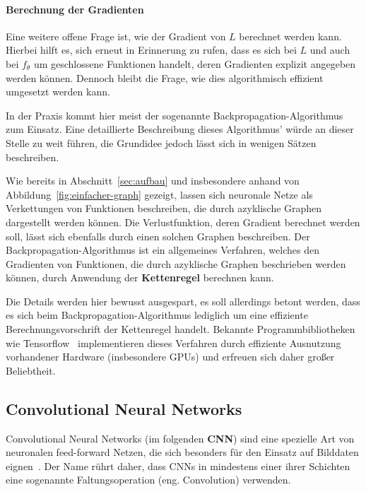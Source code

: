 \paragraph{Berechnung der Gradienten}

Eine weitere offene Frage ist, wie der Gradient von $L$ berechnet werden
kann. Hierbei hilft es, sich erneut in Erinnerung zu rufen, dass es sich
bei $L$ und auch bei $f_\theta$ um geschlossene Funktionen handelt,
deren Gradienten explizit angegeben werden k\"onnen.
Dennoch bleibt die Frage, wie dies algorithmisch effizient umgesetzt werden
kann.

In der Praxis kommt hier meist der sogenannte
Backpropagation-Algorithmus~\cite{backpropagation} zum Einsatz.
Eine detaillierte Beschreibung dieses Algorithmus' w\"urde an dieser
Stelle zu weit f\"uhren, die Grundidee jedoch l\"asst sich in wenigen
S\"atzen beschreiben.

Wie bereits in Abschnitt~\ref{sec:aufbau} und insbesondere anhand von
Abbildung~\ref{fig:einfacher-graph} gezeigt, lassen sich neuronale Netze
als Verkettungen von Funktionen beschreiben, die durch
azyklische Graphen dargestellt werden k\"onnen.
Die Verlustfunktion, deren Gradient berechnet werden soll, l\"asst sich
ebenfalls durch einen solchen Graphen beschreiben.
Der Backpropagation-Algorithmus ist ein allgemeines Verfahren, welches den
Gradienten von
Funktionen, die durch azyklische Graphen beschrieben werden k\"onnen,
durch Anwendung der \textbf{Kettenregel} berechnen kann.

Die Details werden hier bewusst ausgespart, es soll allerdings betont
werden, dass es sich beim Backpropagation-Algorithmus lediglich um eine
effiziente Berechnungsvorschrift der Kettenregel handelt.
Bekannte Programmbibliotheken wie Tensorflow~\cite{tensorflow2015-whitepaper}
implementieren dieses Verfahren durch effiziente Ausnutzung vorhandener
Hardware (insbesondere GPUs) und erfreuen sich daher
gro{\ss}er Beliebtheit.

\subsection{Convolutional Neural Networks}
\label{sec:cnns}

Convolutional Neural Networks (im folgenden \textbf{CNN}) sind eine
spezielle Art von neuronalen feed-forward Netzen, die sich besonders f\"ur den
Einsatz auf Bilddaten eignen~\cite{Goodfellow-et-al-2016}.
Der Name r\"uhrt daher, dass CNNs in mindestens einer ihrer Schichten
eine sogenannte Faltungsoperation (eng. Convolution) verwenden.


